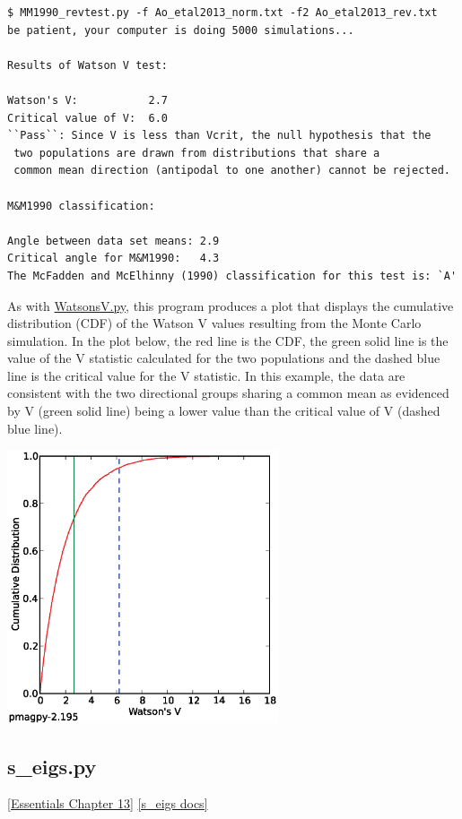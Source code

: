 \documentclass[11pt]{book}
\begin{document}
{\begin{verbatim}
$ MM1990_revtest.py -f Ao_etal2013_norm.txt -f2 Ao_etal2013_rev.txt
be patient, your computer is doing 5000 simulations...

Results of Watson V test:

Watson's V:           2.7
Critical value of V:  6.0
``Pass``: Since V is less than Vcrit, the null hypothesis that the
 two populations are drawn from distributions that share a
 common mean direction (antipodal to one another) cannot be rejected.

M&M1990 classification:

Angle between data set means: 2.9
Critical angle for M&M1990:   4.3
The McFadden and McElhinny (1990) classification for this test is: `A'
\end{verbatim}

As with \href{#WatsonsV.py}{WatsonsV.py}, this program produces a plot that displays the cumulative distribution (CDF) of the Watson V values resulting from the Monte Carlo simulation. In the plot below, the red line is the CDF, the green solid line is the value of the V statistic calculated for the two populations and the dashed blue line is the critical value for the V statistic. In this example, the data are consistent with the two directional groups sharing a common mean as evidenced by V (green solid line) being a lower value than the critical value of V (dashed blue line).

\includegraphics[width=8cm]{EPSfiles/WatsonsV_Ao_etal2013.eps}


\subsection{s\_eigs.py}
\href{http://earthref.org/MAGIC/books/Tauxe/Essentials/WebBook3ch13.html#ch13}{[Essentials Chapter 13]}
\href{https://github.com/PmagPy/PmagPy/blob/master/programs/s_eigs.py}{[s\_eigs docs]}

}
\end{document}
